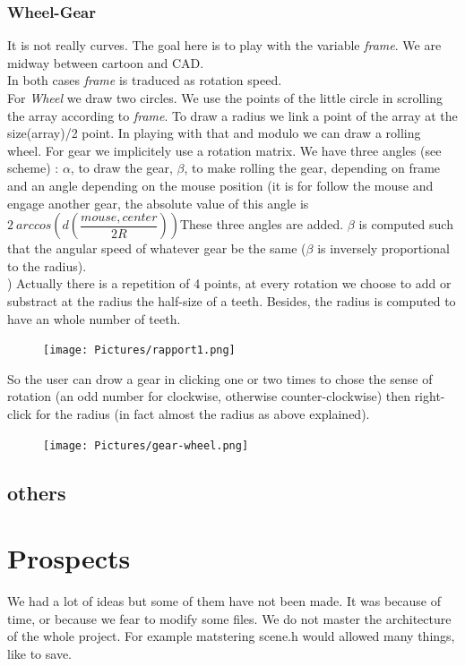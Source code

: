 \documentclass{article}
\begin{document}
\subsubsection*{Wheel-Gear}
It is not really curves. The goal here is to play with the variable \textit{frame}. We are midway between cartoon and CAD.\\
In both cases \textit{frame} is traduced as rotation speed. \\
For \textit{Wheel} we draw two circles. We use the points of the little circle in scrolling the array according to \textit{frame}. To draw a radius we link a point of the array at the size(array)/2 point. In playing with that and modulo we can draw a rolling wheel.
For gear we implicitely use a rotation matrix. We have three angles (see scheme) : $\alpha$, to draw the gear, $\beta$, to make rolling the gear, depending on frame and an angle depending on the mouse position (it is for follow the mouse and engage another gear, the absolute value of this angle is $2\ arccos(d(\dfrac{mouse,center}{2 R}))$These three angles are added. $\beta$ is computed such that the angular speed of whatever gear be the same ($\beta$ is inversely proportional to the radius).\\ )
Actually there is a repetition of 4 points, at every rotation we choose to add or substract at the radius the half-size of a teeth. Besides, the radius is computed to have an whole number of teeth.\\
\begin{figure}[H]
   \texttt{[image: Pictures/rapport1.png]}
\end{figure}
So the user can drow a gear in clicking one or two times to chose the sense of rotation (an odd number for clockwise, otherwise counter-clockwise) then right-click for the radius (in fact almost the radius as above explained).
\begin{figure}[H]
   \texttt{[image: Pictures/gear-wheel.png]}
\end{figure}

\subsection*{others} %
\section*{Prospects}
We had a lot of ideas but some of them have not been made. It was because of time, or because we fear to modify some files. We do not master the architecture of the whole project. For example matstering scene.h would allowed many things, like to save. 
\end{document}
